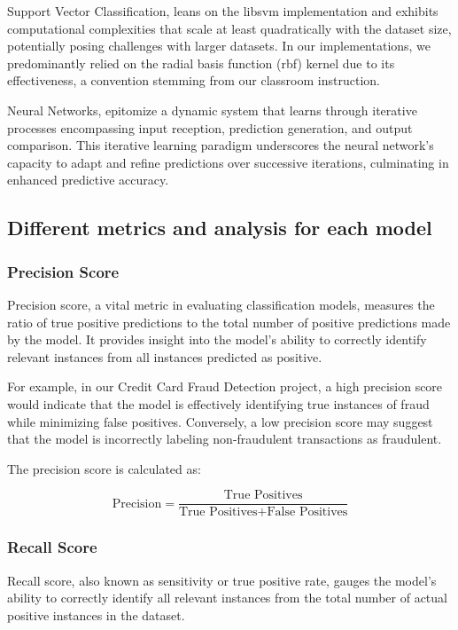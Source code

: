 \documentclass[conference]{IEEEtran}
\begin{document}
Support Vector Classification, leans on the libsvm implementation and exhibits computational complexities that scale at least quadratically with the dataset size, potentially posing challenges with larger datasets. In our implementations, we predominantly relied on the radial basis function (rbf) kernel due to its effectiveness, a convention stemming from our classroom instruction.

Neural Networks, epitomize a dynamic system that learns through iterative processes encompassing input reception, prediction generation, and output comparison. This iterative learning paradigm underscores the neural network's capacity to adapt and refine predictions over successive iterations, culminating in enhanced predictive accuracy.

\subsection{Different metrics and analysis for each model}

\subsubsection{Precision Score}

Precision score, a vital metric in evaluating classification models, measures the ratio of true positive predictions to the total number of positive predictions made by the model. It provides insight into the model's ability to correctly identify relevant instances from all instances predicted as positive.

For example, in our Credit Card Fraud Detection project, a high precision score would indicate that the model is effectively identifying true instances of fraud while minimizing false positives. Conversely, a low precision score may suggest that the model is incorrectly labeling non-fraudulent transactions as fraudulent.

The precision score is calculated as:

\[ \text{Precision} = \frac{\text{True Positives}}{\text{True Positives} + \text{False Positives}} \]

\subsubsection{Recall Score}

Recall score, also known as sensitivity or true positive rate, gauges the model's ability to correctly identify all relevant instances from the total number of actual positive instances in the dataset.
\end{document}
